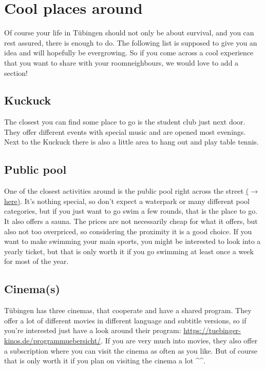 \section{Cool places around}
Of course your life in Tübingen should not only be about survival, and you can rest assured, there is enough to do. The following list is supposed to give you an idea and will hopefully be evergrowing. So if you come across a cool experience that you want to share with your roomneighbours, we would love to add a section!

\subsection{Kuckuck}
The closest you can find some place to go is the student club  just next door. They offer different events with special music and are opened most evenings. Next to the Kuckuck there is also a little area to hang out and play table tennis.

\subsection{Public pool}
One of the closest activities around is the public pool right across the street \href{https://maps.app.goo.gl/NZaCajzPTgFjabqH6}{($\xrightarrow{}$ here)}. It's nothing special, so don't expect a waterpark or many different pool categories, but if you just want to go swim a few rounds, that is the place to go. It also offers a sauna. The prices are not necessarily cheap for what it offers, but also not too overpriced, so considering the proximity it is a good choice. If you want to make swimming your main sports, you might be interested to look into a yearly ticket, but that is only worth it if you go swimming at least once a week for most of the year.

\subsection{Cinema(s)}
Tübingen has three cinemas, that cooperate and have a shared program. They offer a lot of different movies in different language and subtitle versions, so if you're interested just have a look around their program: \url{https://tuebinger-kinos.de/programmuebersicht/}.
If you are very much into movies, they also offer a subscription where you can visit the cinema as often as you like. But of course that is only worth it if you plan on visiting the cinema a lot \^{}\^{}.

